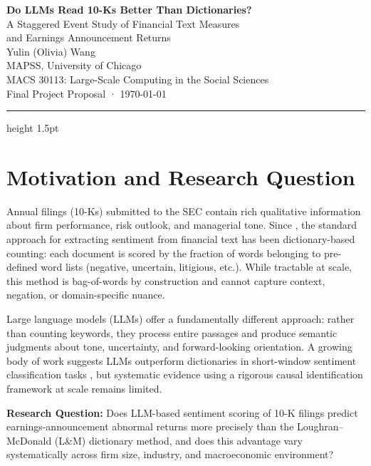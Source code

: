 \documentclass[12pt]{article}
\begin{document}
\begin{center}
    {\LARGE\bfseries\color{primaryblue}
        Do LLMs Read 10-Ks Better Than Dictionaries?}\\[6pt]
    {\large A Staggered Event Study of Financial Text Measures\\
    and Earnings Announcement Returns}\\[18pt]
    {\normalsize Yulin (Olivia) Wang}\\
    {\small MAPSS, University of Chicago}\\[4pt]
    {\small\textcolor{midgray}{MACS 30113: Large-Scale Computing in the Social Sciences}}\\
    {\small\textcolor{midgray}{Final Project Proposal · \today}}
\end{center}

\vspace{0.5em}
\hrule height 1.5pt
\vspace{1.5em}

\section{Motivation and Research Question}

Annual filings (10-Ks) submitted to the SEC contain rich qualitative information
about firm performance, risk outlook, and managerial tone. Since
\citet{LoughranMcDonald2011}, the standard approach for extracting sentiment from
financial text has been dictionary-based counting: each document is scored by the
fraction of words belonging to pre-defined word lists (negative, uncertain,
litigious, etc.). While tractable at scale, this method is bag-of-words by
construction and cannot capture context, negation, or domain-specific nuance.

Large language models (LLMs) offer a fundamentally different approach: rather
than counting keywords, they process entire passages and produce semantic
judgments about tone, uncertainty, and forward-looking orientation. A growing
body of work suggests LLMs outperform dictionaries in short-window sentiment
classification tasks \citep{LopezLira2023}, but systematic evidence using a
rigorous causal identification framework at scale remains limited.

\medskip
\noindent\textbf{Research Question:} Does LLM-based sentiment scoring of 10-K
filings predict earnings-announcement abnormal returns more precisely than the
Loughran--McDonald (L\&M) dictionary method, and does this advantage vary
systematically across firm size, industry, and macroeconomic environment?
\end{document}
